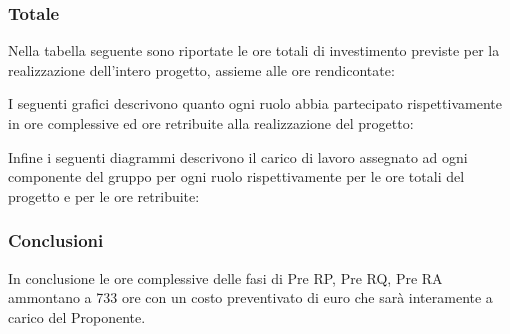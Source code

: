 



\subsubsection{Totale}
Nella tabella seguente sono riportate le ore totali di investimento previste per la realizzazione dell'intero progetto, assieme alle ore rendicontate:

I seguenti grafici descrivono quanto ogni ruolo abbia partecipato rispettivamente in ore complessive ed ore retribuite alla realizzazione del progetto:

Infine i seguenti diagrammi descrivono il carico di lavoro assegnato ad ogni componente del gruppo per ogni ruolo rispettivamente per le ore totali del progetto e per le ore retribuite:

\subsubsection{Conclusioni}
In conclusione le ore complessive delle fasi di Pre RP, Pre RQ, Pre RA ammontano a 733 ore con un costo preventivato di euro  che sarà interamente a carico del Proponente.

